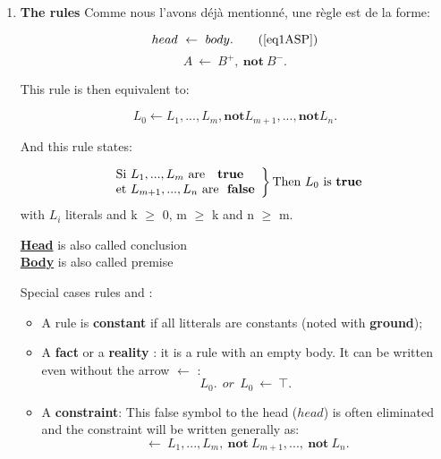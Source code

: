 \begin{enumerate}
\item \textbf{The rules}
Comme nous l’avons déjà mentionné, une règle est de la forme:


\begin{equation} 
head ~ \leftarrow ~ body.
\tag{\eqref{eq1ASP}}
\end{equation}
\begin{equation} \label{eq3ASP}
A ~ \leftarrow ~ B^+, ~ \textbf{not} ~ B^-.
\end{equation}

This rule is then equivalent to:

\begin{equation} \label{eq2ASP}
L_{0} \leftarrow L_{1},...,L_{m}, \textbf{not} L_{m+1},..., \textbf{not} L_{n}.
\end{equation}

And this rule states:

$$
\left.
    \begin{array}{ll}
        \text{Si} ~ L_{1},...,L_{m} ~ \text{are ~ \textbf{true}}\\
        \text{et} ~ L_{m+1},...,L_{n} ~ \text{are~ \textbf{false}}
    \end{array}
\right \} \text{Then} ~ L_{0} ~ \text{is } \textbf{true} 
$$
with $L_{i}$ literals and k $\geq$ 0, m $\geq$ k and n $\geq$ m.

\underline{\textbf{Head}} is also called conclusion \\
\underline{\textbf{Body}} is also called premise 

Special cases rules \cite{Vladimir} and \cite{baral2003knowledge} :\\

\begin{itemize}
\item A rule is \textbf{constant} if all litterals are constants (noted with \textbf{ground});
\item A \textbf{fact} or a \textbf{reality} : it is a rule with an empty body. It can be written even without the arrow $\leftarrow$ :\\
\begin{equation} 
L_{0}. ~~ or ~~ L_{0} ~ \leftarrow ~  \top.
 \label{eq5ASP}
\end{equation}

\item A \textbf{constraint}:
This false symbol to the head ($head$) is often eliminated and the constraint will be written generally as:
\begin{equation} 
 ~ \leftarrow ~ L_{1},...,L_{m}, ~ \textbf{not} ~ L_{m+1},..., ~\textbf{not} ~L_{n}.
 \label{eq6ASP}
\end{equation}


\end{itemize}
\end{enumerate}
